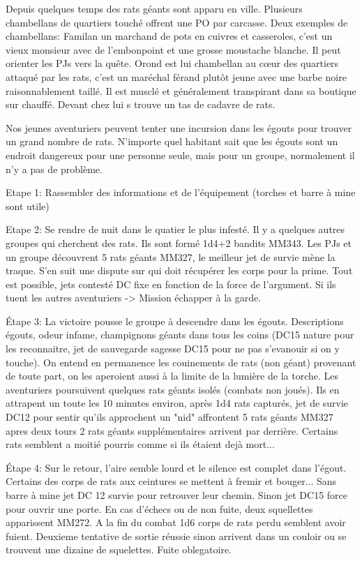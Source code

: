 Depuis quelques temps des rats géants sont apparu en ville. 
Plusieurs chambellans de quartiers touché offrent une PO par carcasse.
Deux exemples de chambellans: Familan un marchand de pots en cuivres et 
casseroles, c'est un vieux monsieur avec de l'embonpoint et une grosse 
moustache blanche. Il peut orienter les PJs vers la quête.
Orond est lui chambellan au c\oe{}ur des quartiers attaqué par les rats,
c'est un maréchal férand plutôt jeune avec une barbe noire raisonnablement
taillé. Il est musclé et généralement transpirant dans sa boutique sur chauffé.
Devant chez lui s trouve un tas de cadavre de rats.

Nos jeunes aventuriers peuvent tenter une incursion dans les égouts pour trouver un grand nombre de rats.
N'importe quel habitant sait que les égouts sont un endroit dangereux pour une personne seule, mais pour 
un groupe, normalement il n'y a pas de problème.

Etape 1: Rassembler des informations et de l'équipement (torches et barre à mine sont utile)

Etape 2: Se rendre de nuit dans le quatier le plus infesté. Il y a quelques autres groupes qui cherchent
des rats. Ils sont formé 1d4+2 bandits MM343. Les PJs et un groupe découvrent 5 rats géants MM327, le 
meilleur jet de survie mène la traque. S'en suit une dispute sur qui doit récupérer les corps pour la 
prime. Tout est possible, jets contesté DC fixe en fonction de la force de l'argument. Si ils tuent les
autres aventuriers -> Mission échapper à la garde.

Étape 3: La victoire pousse le groupe à descendre dans les égouts. Descriptions égouts, odeur infame,
champignons géants dans tous les coins (DC15 nature pour les reconnaitre, jet de sauvegarde sagesse DC15 
pour ne pas s'evanouir si on y touche). On entend en permanence les couinements de rats (non géant) 
provenant de toute part, on les aperoient aussi à la limite de la lumière de la torche. Les aventuriers 
poursuivent quelques rats géants 
isolés (combats non joués). Ils en attrapent un toute les 10 minutes environ, après 1d4 rats capturés, 
jet de survie DC12 pour sentir qu'ils approchent un "nid" affrontent 5 rats géants MM327 apres deux 
tours 2 rats géants supplémentaires
arrivent par derrière. Certains rats semblent a moitié pourris comme si ils étaient dejà mort...

Étape 4: Sur le retour, l'aire semble lourd et le silence est complet dans l'égout. Certains des corps 
de rats aux ceintures se mettent à fremir et bouger... Sans barre à mine
jet DC 12 survie pour retrouver leur chemin. Sinon jet DC15 force pour ouvrir une porte. En cas d'échecs
ou de non fuite, deux squellettes apparissent MM272. A la fin du combat 1d6 corps de rats perdu semblent 
avoir fuient. Deuxieme tentative de sortie réussie sinon arrivent dans un couloir ou se trouvent une dizaine
de squelettes. Fuite oblegatoire.

